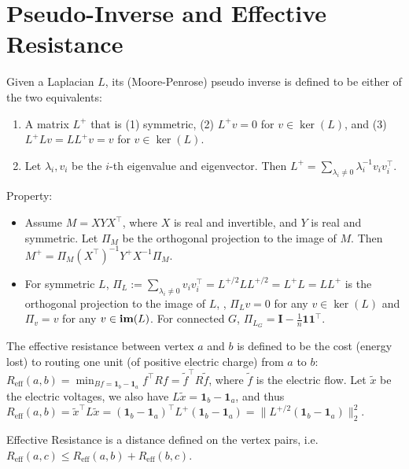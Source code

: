 \section{Pseudo-Inverse and Effective Resistance}

Given a Laplacian $L$, its (Moore-Penrose) pseudo inverse is defined to be either of the two equivalents:
\begin{enumerate}
    \item A matrix $L^+$ that is (1) symmetric, (2) $L^+ v=0$ for $v \in \ker(L)$, and (3) $L^+ L v = L L^+ v = v$ for  $v \in \ker(L)$.
    \item Let $\lambda_i, v_i$ be the $i$-th eigenvalue and eigenvector. Then $L^+ = \sum_{\lambda_i \ne 0} \lambda_i^{-1} v_i v_i^\top$.
\end{enumerate}

Property:
\begin{itemize}
    \item Assume $M=X Y X^\top$, where $X$ is real and invertible, and $Y$ is real and symmetric. Let $\Pi_M$ be the orthogonal projection to the image of $M$. Then $M^+ = \Pi_M (X^\top)^{-1} Y^+ X^{-1} \Pi_M$.
    \item For symmetric $L$, $\Pi_L:= \sum_{\lambda_i \ne 0} v_i v_i^\top =  L^{+/2} L L^{+/2} = L^+ L = L L^+$ is the orthogonal projection to the image of $L$, \ie, $\Pi_L v = 0$ for any $v \in \ker(L)$ and $\Pi_v = v$ for any $v \in \operatorname{\textbf{im}}(L)$. For connected $G$, $\Pi_{L_G} = \boldsymbol{I} - \frac{1}{n} \boldsymbol{1} \boldsymbol{1}^\top$.
\end{itemize}

The effective resistance between vertex $a$ and $b$ is defined to be the cost (energy lost) to routing one unit (of positive electric charge) from $a$ to $b$: $R_{\text{eff}}(a,b) = \min_{Bf = \boldsymbol{1}_b - \boldsymbol{1}_a} f^\top R f = \tilde{f}^\top R \tilde{f}$, where $\tilde{f}$ is the electric flow. Let $\tilde{x}$ be the electric voltages, we also have $L\tilde{x} = \boldsymbol{1}_b - \boldsymbol{1}_a$, and thus $R_{\text{eff}}(a,b) = \tilde{x}^\top L \tilde{x} = (\boldsymbol{1}_b - \boldsymbol{1}_a)^\top L^+ (\boldsymbol{1}_b - \boldsymbol{1}_a) = \|L^{+/2} (\boldsymbol{1}_b - \boldsymbol{1}_a)\|_2^2$.

Effective Resistance is a distance defined on the vertex pairs, i.e. $R_{\text{eff}}(a,c) \le R_{\text{eff}}(a,b) + R_{\text{eff}}(b,c)$.